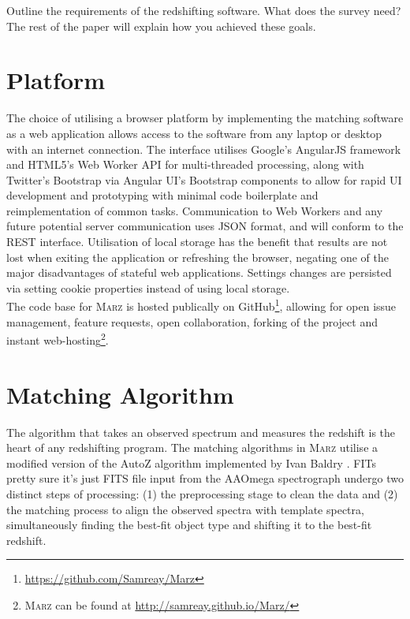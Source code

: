 \documentclass[iop]{emulateapj}
\newcommand{\tam}{\color{blue}}
\newcommand{\tamcom}{\color{red}}
\newcommand{\thesisname}{\textsc{Marz}}
\begin{document}
{\tamcom Outline the requirements of the redshifting software.  What does the survey need?  The rest of the paper will explain how you achieved these goals. }

\section{Platform}

The choice of utilising a browser platform by implementing the matching software as a web application allows access to the software from any laptop or desktop with an internet connection. The interface utilises Google's AngularJS framework and HTML5's Web Worker API for multi-threaded processing, along with Twitter's Bootstrap via Angular UI's Bootstrap components to allow for rapid UI development and prototyping with minimal code boilerplate and reimplementation of common tasks. Communication to Web Workers and any future potential server communication uses JSON format, and will conform to the REST interface. Utilisation of local storage has the benefit that results are not lost when exiting the application or refreshing the browser, negating one of the major disadvantages of stateful web applications. Settings changes are persisted via setting cookie properties instead of using local storage.\\

The code base for \thesisname{} is hosted publically on GitHub\footnote{\url{https://github.com/Samreay/Marz}}, allowing for open issue management, feature requests, open collaboration, forking of the project and instant web-hosting\footnote{\thesisname{} can be found at \url{http://samreay.github.io/Marz/}}.



\section{Matching Algorithm}

{\tam The algorithm that takes an observed spectrum and measures the redshift is the heart of any redshifting program.}
The matching algorithms in \thesisname{} utilise a modified version of the AutoZ algorithm implemented by Ivan Baldry \citep{baldry2014galaxy}. FITs {\tamcom pretty sure it's just FITS} file input from the AAOmega spectrograph undergo two distinct steps of processing: (1) the preprocessing stage to clean the data and (2) the matching process {\tam to align the observed spectra with template spectra, simultaneously finding the best-fit object type and shifting it to the best-fit redshift}.\\
\end{document}
